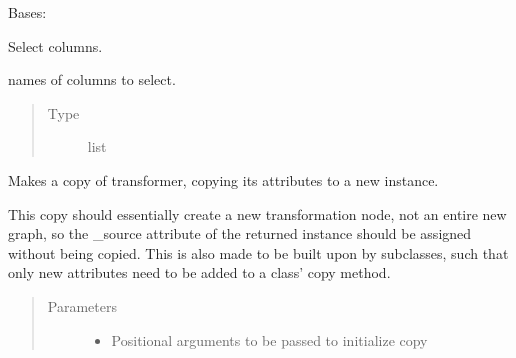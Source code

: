 \documentclass[letterpaper,10pt,english]{sphinxmanual}
\begin{document}
\begin{fulllineitems}
\label{\detokenize{dalio.pipe:dalio.pipe.selection.ColSelect}}
Bases: {\hyperref[\detokenize{dalio.pipe:dalio.pipe.pipe.Pipe}]{}}

Select columns.

\begin{fulllineitems}
\label{\detokenize{dalio.pipe:dalio.pipe.selection.ColSelect._cols}}
names of columns to select.
\begin{quote}\begin{description}
\item[{Type}] \leavevmode
list

\end{description}\end{quote}

\end{fulllineitems}


\begin{fulllineitems}
\label{\detokenize{dalio.pipe:dalio.pipe.selection.ColSelect.copy}}
Makes a copy of transformer, copying its attributes to a new
instance.

This copy should essentially create a new transformation node, not an
entire new graph, so the \_source attribute of the returned instance
should be assigned without being copied. This is also made to be built
upon by subclasses, such that only new attributes need to be added to
a class’ copy method.
\begin{quote}\begin{description}
\item[{Parameters}] \leavevmode\begin{itemize}
\item {} 
 \textendash{} Positional arguments to be passed to initialize copy


\end{itemize}
\end{description}
\end{quote}
\end{fulllineitems}
\end{fulllineitems}
\end{document}
